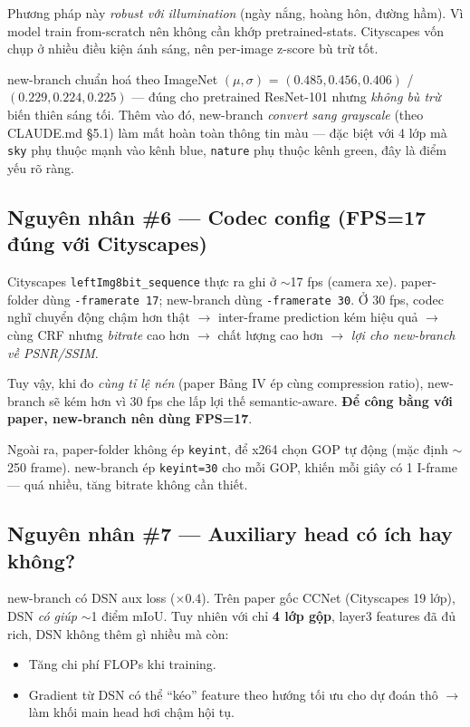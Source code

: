 \documentclass[12pt,a4paper]{article}
\begin{document}
Phương pháp này \emph{robust với illumination} (ngày nắng, hoàng hôn, đường hầm). Vì
model train from-scratch nên không cần khớp pretrained-stats. Cityscapes vốn chụp ở
nhiều điều kiện ánh sáng, nên per-image z-score bù trừ tốt.

new-branch chuẩn hoá theo ImageNet $(\mu, \sigma)$ = $(0.485, 0.456, 0.406)$ /
$(0.229,0.224,0.225)$ — đúng cho pretrained ResNet-101 nhưng \emph{không bù trừ}
biến thiên sáng tối. Thêm vào đó, new-branch \emph{convert sang grayscale} (theo
CLAUDE.md \S 5.1) làm mất hoàn toàn thông tin màu — đặc biệt với 4 lớp mà \texttt{sky}
phụ thuộc mạnh vào kênh blue, \texttt{nature} phụ thuộc kênh green, đây là điểm yếu
rõ ràng.

\subsection{Nguyên nhân \#6 — Codec config (FPS=17 đúng với Cityscapes)}

Cityscapes \texttt{leftImg8bit\_sequence} thực ra ghi ở $\sim$17 fps (camera xe).
paper-folder dùng \texttt{-framerate 17}; new-branch dùng \texttt{-framerate 30}. Ở
30 fps, codec nghĩ chuyển động chậm hơn thật $\to$ inter-frame prediction kém hiệu
quả $\to$ cùng CRF nhưng \emph{bitrate} cao hơn $\to$ chất lượng cao hơn $\to$
\emph{lợi cho new-branch về PSNR/SSIM}.

Tuy vậy, khi đo \emph{cùng tỉ lệ nén} (paper Bảng IV ép cùng compression ratio),
new-branch sẽ kém hơn vì 30 fps che lấp lợi thế semantic-aware. \textbf{Để công bằng
với paper, new-branch nên dùng FPS=17}.

Ngoài ra, paper-folder không ép \texttt{keyint}, để x264 chọn GOP tự động (mặc định
$\sim$250 frame). new-branch ép \texttt{keyint=30} cho mỗi GOP, khiến mỗi giây có 1
I-frame — quá nhiều, tăng bitrate không cần thiết.

\subsection{Nguyên nhân \#7 — Auxiliary head có ích hay không?}

new-branch có DSN aux loss ($\times 0.4$). Trên paper gốc CCNet (Cityscapes 19 lớp),
DSN \emph{có giúp} $\sim$1 điểm mIoU. Tuy nhiên với chỉ \textbf{4 lớp gộp}, layer3
features đã đủ rich, DSN không thêm gì nhiều mà còn:
\begin{itemize}[leftmargin=2em]
  \item Tăng chi phí FLOPs khi training.
  \item Gradient từ DSN có thể ``kéo'' feature theo hướng tối ưu cho dự đoán thô
        $\to$ làm khối main head hơi chậm hội tụ.
\end{itemize}
\end{document}
